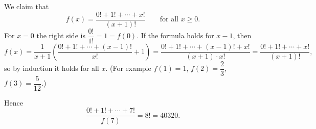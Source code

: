 We claim that
\[f(x)=\dfrac{0!+1!+\cdots+x!}{(x+1)!}\qquad\text{for all }x\ge0.\]
For $x=0$ the right side is $\dfrac{0!}{1!}=1=f(0)$. If the formula holds for $x-1$, then
\[f(x)=\dfrac{1}{x+1}\left(\dfrac{0!+1!+\cdots+(x-1)!}{x!}+1\right)=\dfrac{0!+1!+\cdots+(x-1)!+x!}{(x+1)\cdot x!}=\dfrac{0!+1!+\cdots+x!}{(x+1)!},\]
so by induction it holds for all $x$. (For example $f(1)=1$, $f(2)=\dfrac{2}{3}$, $f(3)=\dfrac{5}{12}$.)

Hence
\[\dfrac{0!+1!+\cdots+7!}{f(7)}=8!=\boxed{40320}.\]
